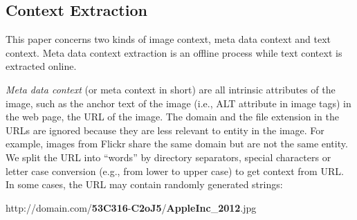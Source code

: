 \subsection{Context Extraction}
\label{sec:context}
This paper concerns two kinds of image context, meta data context
and text context. Meta data context extraction is an offline process while
text context is extracted online.

{\em Meta data context} (or meta context in short)
are all intrinsic attributes of the image, such as the anchor text of
the image (i.e., ALT attribute in image tags) in the web page,
the URL of the image.
The domain and the file extension in the URLs are ignored because they are less
relevant to entity in the image. For example, images from
Flickr share the same domain but are not the same entity.
We split the URL into ``words'' by directory separators,
special characters or letter case conversion (e.g., from lower to upper case)
to get context from URL.
In some cases, the URL may contain randomly generated strings:

\smallskip
http://domain.com/\textbf{53C316}-\textbf{C2oJ5}/\textbf{AppleInc}\_\textbf{2012}.jpg
\smallskip

